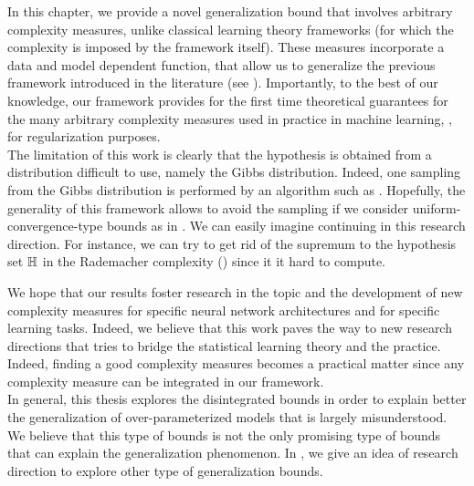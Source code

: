In this chapter, we provide a novel generalization bound that involves arbitrary complexity measures, unlike classical learning theory frameworks (for which the complexity is imposed by the framework itself).
These measures incorporate a data and model dependent function, that allow us to generalize the previous framework introduced in the literature (see ).
Importantly, to the best of our knowledge, our framework provides for the first time theoretical guarantees for the many arbitrary complexity measures used in practice in machine learning, \eg,  for regularization purposes.\\

The limitation of this work is clearly that the hypothesis is obtained from a distribution difficult to use, namely the Gibbs distribution.
Indeed, one sampling from the Gibbs distribution is performed by an algorithm such as .
Hopefully, the generality of this framework allows to avoid the sampling if we consider uniform-convergence-type bounds as in .
We can easily imagine continuing in this research direction.
For instance, we can try to get rid of the supremum \wrt to the hypothesis set $\mathbb{H}$ in the Rademacher complexity () since it it hard to compute.

We hope that our results foster research in the topic and the development of new complexity measures for specific neural network architectures and for specific learning tasks.
Indeed, we believe that this work paves the way to new research directions that tries to bridge the statistical learning theory and the practice.
Indeed, finding a good complexity measures becomes a practical matter since any complexity measure can be integrated in our framework.\\

In general, this thesis explores the disintegrated bounds in order to explain better the generalization of over-parameterized models that is largely misunderstood. 
We believe that this type of bounds is not the only promising type of bounds that can explain the generalization phenomenon.
In , we give an idea of research direction to explore other type of generalization bounds.